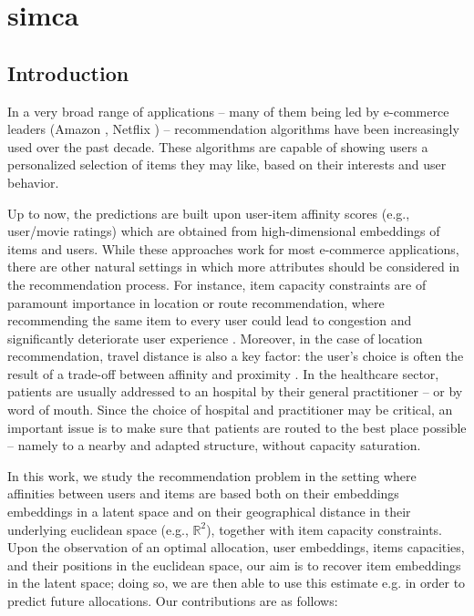 \chapter{\acf{simca}}

\section{Introduction}

In a very broad range of applications -- many of them being led by e-commerce leaders (Amazon \cite{linden_amazoncom_2003}, Netflix \cite{koren_matrix_2009}) -- recommendation algorithms have been increasingly used over the past decade. These algorithms are capable of showing users a personalized selection of items they may like, based on their interests and user behavior.

Up to now, the predictions are built upon user-item affinity scores (e.g., user/movie ratings) which are obtained from high-dimensional embeddings of items and users. While these approaches work for most e-commerce applications, there are other natural settings in which more attributes should be considered in the recommendation process. For instance, item capacity constraints are of paramount importance in location or route recommendation, where recommending the same item to every user could lead to congestion and significantly deteriorate  user experience \cite{christakopoulou_recommendation_2017}. Moreover, in the case of location recommendation, travel distance is also a key factor: the user's choice is often the result of a trade-off between affinity and proximity \cite{zhao_survey_2016}. In the healthcare sector, patients are usually addressed to an hospital by their general practitioner -- or by word of mouth. Since the choice of hospital and practitioner may be critical, an important issue is to make sure that patients are routed to the best place possible -- namely to a nearby and adapted structure, without capacity saturation.

In this work, we study the recommendation problem in the setting where affinities between users and items are based both on their embeddings embeddings in a latent space and on their geographical distance in their underlying euclidean space (e.g., $\mathbb{R}^2$), together with item capacity constraints.  Upon the observation of an optimal allocation, user embeddings, items capacities, and their positions in the euclidean space, our aim is to recover item embeddings in the latent space; doing so, we are then able to use this estimate e.g. in order to predict future allocations. Our contributions are as follows:

